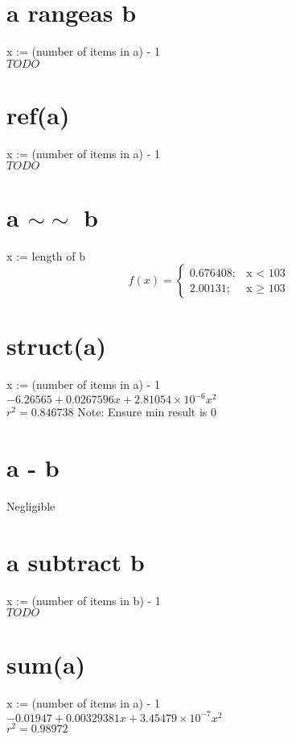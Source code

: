 \documentclass[12pt]{article}
\begin{document}
	\section{a rangeas b}
	x := (number of items in a) - 1\\
	$TODO$
	
	\section{ref(a)}
	x := (number of items in a) - 1\\
	$TODO$
	
	\section{a $\sim\sim$ b}
	x := length of b
	\begin{displaymath}
		f(x) = \left\{
			\begin{array}{lr}
				0.676408; & \text{x $<$ 103}\\
				2.00131; & \text{x $\geq$ 103}
			\end{array}
		\right.
	\end{displaymath}
	
	\section{struct(a)}
	x := (number of items in a) - 1\\
	$-6.26565 + 0.0267596 x + 2.81054 \times 10^{-6} x ^2$\\
	$r^2 = 0.846738$
	Note: Ensure min result is 0
	
	\section{a - b}
	Negligible
	
	\section{a subtract b}
	x := (number of items in b) - 1\\
	$TODO$
	
	\section{sum(a)}
	x := (number of items in a) - 1\\
	$-0.01947 + 0.00329381 x + 3.45479 \times 10^{-7} x^2$\\
	$r^2 = 0.98972$
	
\end{document}
